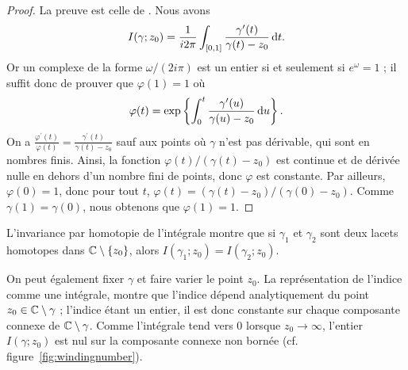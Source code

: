 \begin{proof}
La preuve est celle de \cite{rudin1988analyse}. Nous avons
\[I(\gamma;z_0) = \frac{1}{i 2 \pi}\int_{[0,1]} \frac{\gamma^\prime(t)}{\gamma(t)-z_0} \mathop{}\mathopen{}\mathrm{d} t.\]
Or un complexe de la forme $\omega/(2 i \pi)$ est un entier si et seulement si $e^\omega=1$ ; il suffit donc de prouver que $\varphi(1)=1$ où 
\[\varphi(t)=\exp \left \{\int_0^t \frac{\gamma^\prime(u)}{\gamma(u)-z_0} \mathop{}\mathopen{}\mathrm{d} u \right\}.\]
On a $\frac{\varphi^\prime(t)}{\varphi(t)} = \frac{\gamma^\prime(t)}{\gamma(t)-z_0}$ sauf aux points où $\gamma$ n'est pas dérivable, qui sont en nombres finis. Ainsi, la fonction $\varphi(t)/(\gamma(t)-z_0)$ est continue et de dérivée nulle en dehors d'un nombre fini de points, donc $\varphi$ est constante. Par ailleurs, $\varphi(0) =1$, donc pour tout $t$, $ \varphi(t) = (\gamma(t) -z_0)/ (\gamma(0) -z_0)$. Comme $\gamma(1)=\gamma(0)$, nous obtenons que $\varphi(1)=1$.
\end{proof}






L'invariance par homotopie de l'intégrale montre que si $\gamma_1$ et $\gamma_2$ sont deux lacets homotopes dans $\mathbb{C} \setminus \{z_0\}$, alors $I(\gamma_1 ; z_0) = I(\gamma_2 ; z_0)$.

On peut également fixer $\gamma$ et faire varier le point $z_0$. La représentation de l'indice comme une intégrale, montre que l'indice dépend analytiquement du point $z_0 \in \mathbb{C} \setminus \gamma$ ; l'indice étant un entier, il est donc constante sur chaque composante connexe de $\mathbb{C} \setminus \gamma$. Comme l'intégrale tend vers $0$  lorsque $z_0 \to  \infty$, l'entier $I(\gamma ; z_0)$ est nul sur la composante connexe non bornée (cf. figure~\ref{fig:windingnumber}).

